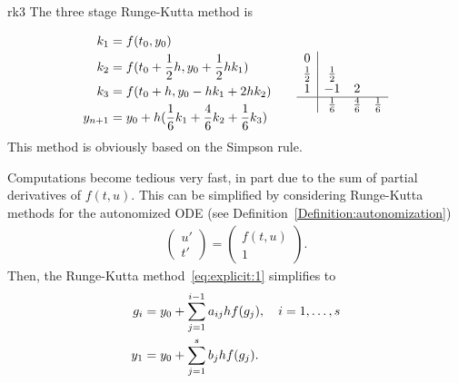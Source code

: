 \begin{Example}{rk3}
  The three stage Runge-Kutta method is

  \begin{gather*}
    \begin{aligned}
      k_1 & = f(t_0, y_0) \\
      k_2 & = f(t_0 + \frac12 h, y_0 + \frac12 h k_1) \\
      k_3 & = f(t_0 + h, y_0 - h k_1 + 2 h k_2) \\
      y_{n+1} & = y_0 + h ( \frac16 k_1 + \frac46 k_2 + \frac16 k_3 ) \\
    \end{aligned}
    \qquad
    \begin{array}{c|ccc}
      0 & \\
      \frac12 & \frac12 \\
      1 & -1 & 2 \\
      \hline
        & \frac16 & \frac46 & \frac16 \\
    \end{array}
  \end{gather*}
  This method is obviously based on the Simpson rule.
\end{Example}

\begin{remark}
  Computations become tedious very fast, in part due to the sum of
  partial derivatives of $f(t,u)$. This can be simplified by
  considering Runge-Kutta methods for the autonomized ODE (see
  Definition~\ref{Definition:autonomization})
  \begin{gather*}
    \begin{pmatrix} u' \\ t' \end{pmatrix} = 
    \begin{pmatrix} f(t,u) \\ 1 \end{pmatrix}.
  \end{gather*}
  Then, the Runge-Kutta method~\eqref{eq:explicit:1} simplifies to
  \begin{gather}
    \label{eq:explicit:7a}
    \begin{split}
      g_i &= y_0 +
      \sum_{j=1}^{i-1} a_{ij} h f(g_j),\quad i=1,\dots,s
      \\
      y_1 &= y_0 + \sum_{j=1}^s b_j h f(g_j).
    \end{split}
  \end{gather}
\end{remark}

